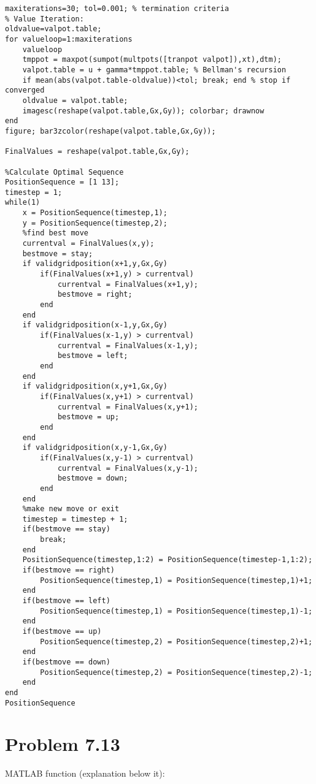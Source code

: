 \documentclass[11pt,a4paper,oneside]{report}
\begin{document}
\begin{lstlisting}
maxiterations=30; tol=0.001; % termination criteria
% Value Iteration:
oldvalue=valpot.table;
for valueloop=1:maxiterations
	valueloop
	tmppot = maxpot(sumpot(multpots([tranpot valpot]),xt),dtm);
	valpot.table = u + gamma*tmppot.table; % Bellman's recursion
	if mean(abs(valpot.table-oldvalue))<tol; break; end % stop if converged
	oldvalue = valpot.table;
	imagesc(reshape(valpot.table,Gx,Gy)); colorbar; drawnow
end
figure; bar3zcolor(reshape(valpot.table,Gx,Gy));

FinalValues = reshape(valpot.table,Gx,Gy);

%Calculate Optimal Sequence
PositionSequence = [1 13];
timestep = 1;
while(1)
    x = PositionSequence(timestep,1);
    y = PositionSequence(timestep,2);
    %find best move
    currentval = FinalValues(x,y);
    bestmove = stay;
    if validgridposition(x+1,y,Gx,Gy)
        if(FinalValues(x+1,y) > currentval)
            currentval = FinalValues(x+1,y);
            bestmove = right;
        end
    end
    if validgridposition(x-1,y,Gx,Gy)
        if(FinalValues(x-1,y) > currentval)
            currentval = FinalValues(x-1,y);
            bestmove = left;
        end
    end
    if validgridposition(x,y+1,Gx,Gy)
        if(FinalValues(x,y+1) > currentval)
            currentval = FinalValues(x,y+1);
            bestmove = up;
        end
    end
    if validgridposition(x,y-1,Gx,Gy)
        if(FinalValues(x,y-1) > currentval)
            currentval = FinalValues(x,y-1);
            bestmove = down;
        end
    end
    %make new move or exit
    timestep = timestep + 1;
    if(bestmove == stay)
        break;
    end
    PositionSequence(timestep,1:2) = PositionSequence(timestep-1,1:2);
    if(bestmove == right)
        PositionSequence(timestep,1) = PositionSequence(timestep,1)+1;
    end
    if(bestmove == left)
        PositionSequence(timestep,1) = PositionSequence(timestep,1)-1;
    end
    if(bestmove == up)
        PositionSequence(timestep,2) = PositionSequence(timestep,2)+1;
    end
    if(bestmove == down)
        PositionSequence(timestep,2) = PositionSequence(timestep,2)-1;
    end
end
PositionSequence
\end{lstlisting}
\section*{Problem 7.13}

MATLAB function (explanation below it):
\end{document}
